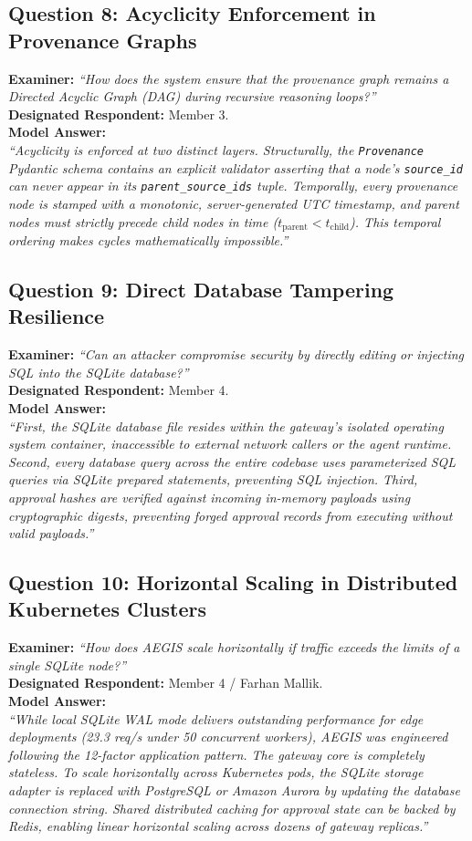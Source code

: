 \subsection{Question 8: Acyclicity Enforcement in Provenance Graphs}
\textbf{Examiner:} \textit{``How does the system ensure that the provenance graph remains a Directed Acyclic Graph (DAG) during recursive reasoning loops?''} \\
\textbf{Designated Respondent:} Member 3. \\
\textbf{Model Answer:} \\
\textit{``Acyclicity is enforced at two distinct layers. Structurally, the \texttt{Provenance} Pydantic schema contains an explicit validator asserting that a node's \texttt{source\_id} can never appear in its \texttt{parent\_source\_ids} tuple. Temporally, every provenance node is stamped with a monotonic, server-generated UTC timestamp, and parent nodes must strictly precede child nodes in time ($t_{\text{parent}} < t_{\text{child}}$). This temporal ordering makes cycles mathematically impossible.''}

\subsection{Question 9: Direct Database Tampering Resilience}
\textbf{Examiner:} \textit{``Can an attacker compromise security by directly editing or injecting SQL into the SQLite database?''} \\
\textbf{Designated Respondent:} Member 4. \\
\textbf{Model Answer:} \\
\textit{``First, the SQLite database file resides within the gateway's isolated operating system container, inaccessible to external network callers or the agent runtime. Second, every database query across the entire codebase uses parameterized SQL queries via SQLite prepared statements, preventing SQL injection. Third, approval hashes are verified against incoming in-memory payloads using cryptographic digests, preventing forged approval records from executing without valid payloads.''}

\subsection{Question 10: Horizontal Scaling in Distributed Kubernetes Clusters}
\textbf{Examiner:} \textit{``How does AEGIS scale horizontally if traffic exceeds the limits of a single SQLite node?''} \\
\textbf{Designated Respondent:} Member 4 / Farhan Mallik. \\
\textbf{Model Answer:} \\
\textit{``While local SQLite WAL mode delivers outstanding performance for edge deployments (23.3 req/s under 50 concurrent workers), AEGIS was engineered following the 12-factor application pattern. The gateway core is completely stateless. To scale horizontally across Kubernetes pods, the SQLite storage adapter is replaced with PostgreSQL or Amazon Aurora by updating the database connection string. Shared distributed caching for approval state can be backed by Redis, enabling linear horizontal scaling across dozens of gateway replicas.''}

